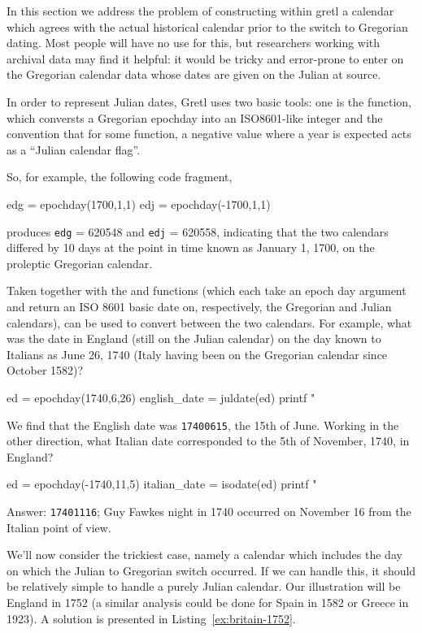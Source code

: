 In this section we address the problem of constructing within gretl a
calendar which agrees with the actual historical calendar prior to
the switch to Gregorian dating. Most people will have no use for
this, but researchers working with archival data may find it helpful:
it would be tricky and error-prone to enter on the Gregorian calendar
data whose dates are given on the Julian at source.

In order to represent Julian dates, Gretl uses two basic tools: one is
the  function, which conversts a Gregorian epochday into
an ISO8601-like integer and the convention that for some function,
a negative value where a year is expected acts as a ``Julian calendar
flag''.

So, for example, the following code fragment,
%
\begin{code}
edg = epochday(1700,1,1)
edj = epochday(-1700,1,1)
\end{code}
%
produces \texttt{edg} = 620548 and \texttt{edj} = 620558, indicating
that the two calendars differed by 10 days at the point in time
known as January 1, 1700, on the proleptic Gregorian calendar.

Taken together with the  and 
functions (which each take an epoch day argument and return an ISO
8601 basic date on, respectively, the Gregorian and Julian calendars),
 can be used to convert between the two calendars.
For example, what was the date in England (still on the Julian
calendar) on the day known to Italians as June 26, 1740 (Italy having
been on the Gregorian calendar since October 1582)?
%
\begin{code}
ed = epochday(1740,6,26)
english_date = juldate(ed)
printf "%
\end{code}
%
We find that the English date was \texttt{17400615}, the 15th of June.
Working in the other direction, what Italian date corresponded to the
5th of November, 1740, in England?
%
\begin{code}
ed = epochday(-1740,11,5)
italian_date = isodate(ed)
printf "%
\end{code}
%
Answer: \texttt{17401116}; Guy Fawkes night in 1740 occurred on 
November 16 from the Italian point of view.

We'll now consider the trickiest case, namely a calendar which includes
the day on which the Julian to Gregorian switch occurred. If we can
handle this, it should be relatively simple to handle a purely Julian
calendar. Our illustration will be England in 1752 (a similar analysis
could be done for Spain in 1582 or Greece in 1923). A solution
is presented in Listing~\ref{ex:britain-1752}.

